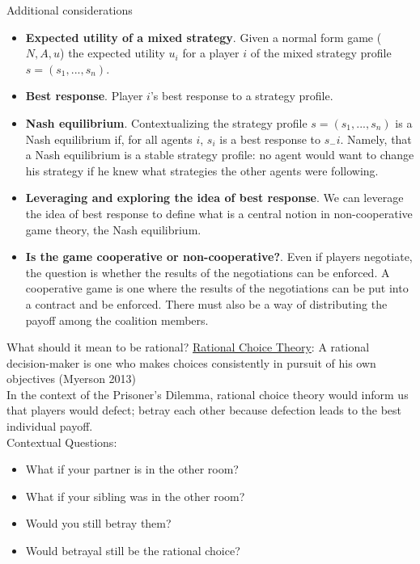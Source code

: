\documentclass[10pt]{beamer} %
\theoremstyle{plain} %
\theoremstyle{definition} %
\begin{document}
\begin{frame}{Additional considerations}

\begin{itemize}
\item \textbf{Expected utility of a mixed strategy}. Given a normal form game ($N, A, u$) the expected utility $u_i$ for a player $i$ of the mixed strategy profile $s=(s_1,..., s_n)$.
\item \textbf{Best response}. Player $i$'s best response to a strategy profile.
\item \textbf{Nash equilibrium}. Contextualizing the strategy profile $s = (s_1, . . . , s_n)$ is a Nash equilibrium if, for all agents $i$, $s_i$ is a best response to $s_−i$. Namely, that a Nash equilibrium is a stable strategy profile: no agent would want to change his strategy if he knew what strategies the other agents were following. 
\item \textbf{Leveraging and exploring the idea of best response}. We can leverage the idea
of best response to define what is a central notion in non-cooperative game theory, the Nash equilibrium.
\item \textbf{Is the game cooperative or non-cooperative?}. Even if players negotiate, the question is whether the results
of the negotiations can be enforced. A cooperative game is one where the results of the negotiations can be put into a contract and be enforced. There must also be a way of
distributing the payoff among the coalition members.
\end{itemize}
\end{frame}


\begin{frame}{\color{Maroon} What should it mean to be rational?}
\noindent\underline{Rational Choice Theory}: A rational decision-maker is one who makes choices consistently in pursuit of his own objectives (Myerson 2013) \\
\vfill
 In the context of the Prisoner's Dilemma, rational choice theory would inform us that players would defect; betray each other because defection leads to the best individual payoff. \\
\vfill
\noindent Contextual Questions:
\begin{itemize}
    \item What if your partner is in the other room? 
    \item What if your sibling was in the other room?
    \item Would you still betray them? 
    \item Would betrayal still be the rational choice?
\end{itemize}

\end{frame}
\end{document}
